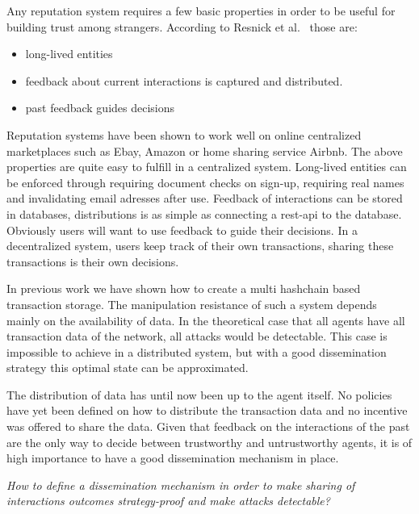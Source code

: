 
Any reputation system requires a few basic properties in order to be useful for 
building trust among strangers. According to Resnick et al.~\cite{resnick2000reputation} those are:

\begin{itemize}
\item long-lived entities
\item feedback about current interactions is captured and distributed.
\item past feedback guides decisions
\end{itemize}

Reputation systems have been shown to work well on online centralized marketplaces such
as Ebay, Amazon or home sharing service Airbnb. The above properties are quite 
easy to fulfill in a centralized system. Long-lived entities can be enforced
through requiring document checks on sign-up, requiring real names and invalidating
email adresses after use. Feedback of interactions can be stored in databases, 
distributions is as simple as connecting a rest-api to the database. Obviously
users will want to use feedback to guide their decisions. In a decentralized 
system, users keep track of their own transactions, sharing these transactions
is their own decisions. 

In previous work we have shown how to create a multi hashchain based transaction
storage. The manipulation resistance of such a system depends mainly on the 
availability of data. In the theoretical case that all agents have all transaction
data of the network, all attacks would be detectable. This case is impossible
to achieve in a distributed system, but with a good dissemination strategy this
optimal state can be approximated. 

The distribution of data has until now been up to the agent itself. 
No policies have yet been defined on how to distribute
the transaction data and no incentive was offered to share the data. Given that
feedback on the interactions of the past are the only way to decide between 
trustworthy and untrustworthy agents, it is of high importance to have a good
dissemination mechanism in place.

\begin{center}
\textit{How to define a dissemination mechanism in order to make sharing of 
interactions outcomes strategy-proof and make attacks detectable?}
\end{center}

